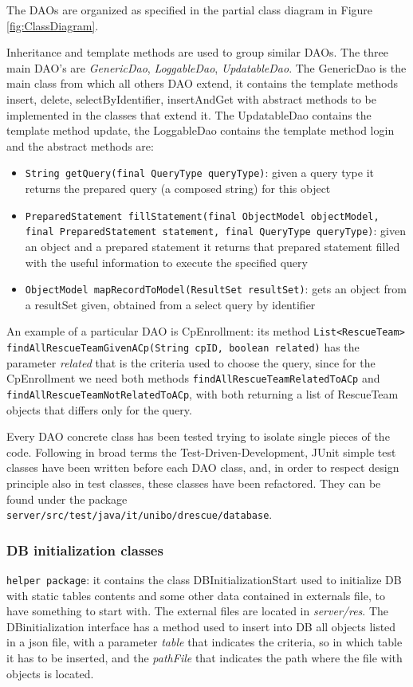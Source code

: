 \documentclass[a4paper,12pt]{report}
\begin{document}
The DAOs are organized as specified in the partial class diagram in Figure \ref{fig:ClassDiagram}. 

Inheritance and template methods are used to group similar DAOs. The three main DAO's are \textit{GenericDao}, \textit{LoggableDao}, \textit{UpdatableDao}. The GenericDao is the main class from which all others DAO extend, it contains the template methods insert, delete, selectByIdentifier, insertAndGet with abstract methods to be implemented in the classes that extend it.
The UpdatableDao contains the template method update, the LoggableDao contains the template method login and the abstract methods are:
\begin{itemize}
\item \texttt{String getQuery(final QueryType queryType)}: given a query type it returns the prepared query (a composed string) for this object
\item \texttt{PreparedStatement fillStatement(final ObjectModel objectModel, \\final PreparedStatement statement, final QueryType queryType)}: given an object and a prepared statement it returns that prepared statement filled with the useful information to execute the specified query
\item \texttt{ObjectModel mapRecordToModel(ResultSet resultSet)}: gets an object from a resultSet given, obtained from a select query by identifier
\end{itemize}

An example of a particular DAO is CpEnrollment: its method \texttt{List<RescueTeam>} \texttt{findAllRescueTeamGivenACp(String cpID, boolean related)}
has the parameter \textit{related} that is the criteria used to choose the query, since for the CpEnrollment we need both methods \texttt{findAllRescueTeamRelatedToACp} and \texttt{findAllRescueTeamNotRelatedToACp}, with both returning a list of RescueTeam objects that differs only for the query.

Every DAO concrete class has been tested trying to isolate single pieces of the code. Following in broad terms the Test-Driven-Development, JUnit simple test classes have been written before each DAO class, and, in order to respect design principle also in test classes, these classes have been refactored. They can be found under the package\\ \texttt{server/src/test/java/it/unibo/drescue/database}.

\subsubsection{DB initialization classes}
\texttt{helper package}: it contains the class DBInitializationStart used to initialize DB with static tables contents and some other data contained in externals file, to have something to start with.
The external files are located in \textit{server/res}. The DBinitialization interface has a method used to insert into DB all objects listed in a json file, with a parameter \textit{table} that indicates the criteria, so in which table it has to be inserted, and the \textit{pathFile} that indicates the path where the file with objects is located.
\end{document}
